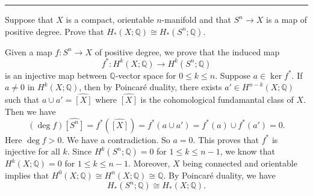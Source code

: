 \documentclass[letterpaper, 12pt]{article}
\begin{document}
\noindent\rule{7in}{2.8pt}
\begin{problem}{5}
Suppose that \(X\) is a compact, orientable \(n\)-manifold and that \(S^n\rightarrow X\) is a map of positive degree. Prove that \(H_*(X;\mathbb{Q})\cong H_*(S^n;\mathbb{Q})\).
\end{problem}
\begin{solution}
Given a map \(f:S^n\rightarrow X\) of positive degree, we prove that the induced map 
\[f^*:H^k(X;\mathbb{Q})\rightarrow H^k(S^n;\mathbb{Q})\]
is an injective map between \(\mathbb{Q}\)-vector space for \(0\leq k\leq n\). Suppose \(a\in \ker f^*\). If \(a\neq 0\) in \(H^k(X;\mathbb{Q})\), then by Poincaré duality, there exists \(a'\in H^{n-k}(X;\mathbb{Q})\) such that \(a\cup a'=\widehat{[X]}\) where \(\widehat{[X]}\) is the cohomological fundamantal class of \(X\). Then we have 
\[(\deg f)\widehat{[S^n]}=f^*(\widehat{[X]})=f^*(a\cup a')=f^*(a)\cup f^*(a')=0.\]
Here \(\deg f>0\). We have a contradiction. So \(a=0\). This proves that \(f^*\) is injective for all \(k\). Since \(H^k(S^n;\mathbb{Q})=0\) for \(1\leq k\leq n-1\), we know that \(H^k(X;\mathbb{Q})=0\) for \(1\leq k\leq n-1\). Moreover, \(X\) being connected and orientable implies that \(H^0(X;\mathbb{Q})\cong H^n(X;\mathbb{Q})\cong \mathbb{Q}\). By Poincaré duality, we have 
\[H_*(S^n;\mathbb{Q})\cong H_*(X;\mathbb{Q}).\]
\end{solution}
\end{document}
